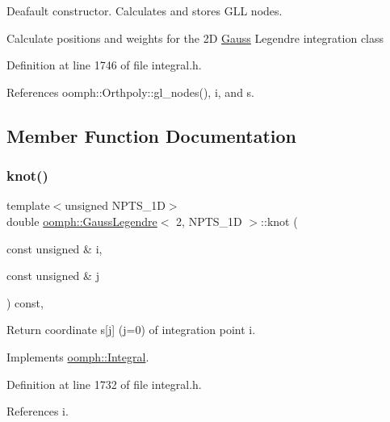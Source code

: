 Deafault constructor. Calculates and stores G\+LL nodes. 

Calculate positions and weights for the 2D \hyperlink{classoomph_1_1Gauss}{Gauss} Legendre integration class 

Definition at line 1746 of file integral.\+h.



References oomph\+::\+Orthpoly\+::gl\+\_\+nodes(), i, and s.



\subsection{Member Function Documentation}
\mbox{\label{classoomph_1_1GaussLegendre_3_012_00_01NPTS__1D_01_4_aa06ad7b9d8c9100a033021bf0478fd93}} 
\subsubsection{\texorpdfstring{knot()}{knot()}}
{\footnotesize\ttfamily template$<$unsigned N\+P\+T\+S\+\_\+1D$>$ \\
double \hyperlink{classoomph_1_1GaussLegendre}{oomph\+::\+Gauss\+Legendre}$<$ 2, N\+P\+T\+S\+\_\+1D $>$\+::knot (\begin{DoxyParamCaption}\item[{const unsigned \&}]{i,  }\item[{const unsigned \&}]{j }\end{DoxyParamCaption}) const\hspace{0.3cm}{\ttfamily [inline]}, {\ttfamily [virtual]}}



Return coordinate s\mbox{[}j\mbox{]} (j=0) of integration point i. 



Implements \hyperlink{classoomph_1_1Integral_a1a2122f99a87c18649bafdd9ed739758}{oomph\+::\+Integral}.



Definition at line 1732 of file integral.\+h.



References i.

